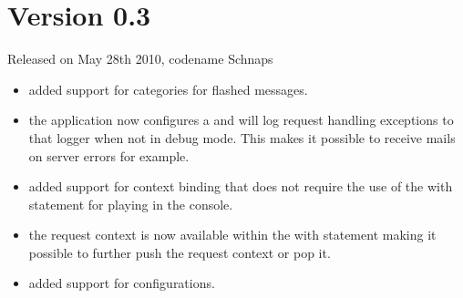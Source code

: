 \documentclass[a4paper,12pt]{sphinxmanual}
\begin{document}
\section{Version 0.3}
\label{changelog:version-0-3}
Released on May 28th 2010, codename Schnaps
\begin{itemize}
\item {} 
added support for categories for flashed messages.

\item {} 
the application now configures a  and will
log request handling exceptions to that logger when not in debug
mode.  This makes it possible to receive mails on server errors
for example.

\item {} 
added support for context binding that does not require the use of
the with statement for playing in the console.

\item {} 
the request context is now available within the with statement making
it possible to further push the request context or pop it.

\item {} 
added support for configurations.

\end{itemize}
\end{document}
